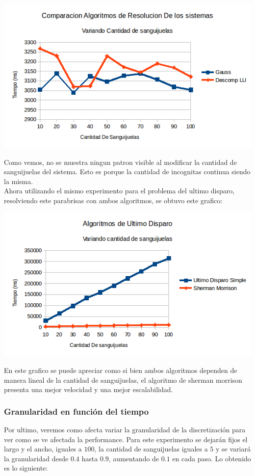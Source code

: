 \begin{center}
 \includegraphics[width=400pt]{imagenes/testeo/sangGauss.png}
\end{center}

Como vemos, no se muestra ningun patron visible al modificar la cantidad de sanguijuelas del sistema. Esto es porque la cantidad de incognitas continua siendo la misma.
\\
Ahora utilizando el mismo experimento para el problema del ultimo disparo, resolviendo este parabrisas con ambos algoritmos, se obtuvo este grafico:

\begin{center}
 \includegraphics[width=400pt]{imagenes/testeo/sangSalv.png}
\end{center}

En este grafico se puede apreciar como si bien ambos algoritmos dependen de manera lineal de la cantidad de sanguijuelas, el algoritmo de sherman morrison presenta una mejor velocidad y una mejor escalabilidad.

\subsubsection{Granularidad en función del tiempo}
Por ultimo, veremos como afecta variar la granularidad de la discretización para ver como se ve afectada la performance. Para este experimento se dejarán fijos el largo y el ancho, iguales a $100$, la cantidad de sanguijuelas iguales a $5$ y se variará la granularidad desde $0.4$ hasta $0.9$, aumentando de $0.1$ en cada paso. Lo obtenido es lo siguiente:

